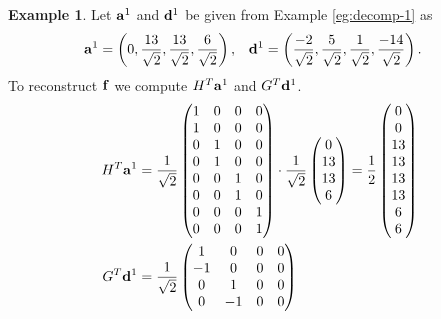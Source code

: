 \documentclass[12pt]{article}
\theoremstyle{definition}
\newtheorem{example}[definition]{Example}
\begin{document}
  \begin{example}
    Let \(\vb{a}^1\) and \(\vb{d}^1\) be given from Example \ref{eg:decomp-1} as
    \begin{align*}
      \vb{a}^1 &= \left(
        0,
        \frac{13}{\sqrt{2}},
        \frac{13}{\sqrt{2}},
        \frac{6}{\sqrt{2}}
      \right), &
      \vb{d}^1 &= \left(
        \frac{-2}{\sqrt{2}},
        \frac{5}{\sqrt{2}},
        \frac{1}{\sqrt{2}},
        \frac{-14}{\sqrt{2}}
      \right).
    \end{align*}
    To reconstruct \(\vb{f}\) we compute \(H^T\vb{a}^1\) and \(G^T\vb{d}^1\).
    \begin{align*}
      H^T\vb{a}^1 &= \frac{1}{\sqrt{2}}
      \begin{pmatrix}
        1 & 0 & 0 & 0\\
        1 & 0 & 0 & 0\\
        0 & 1 & 0 & 0\\
        0 & 1 & 0 & 0\\
        0 & 0 & 1 & 0\\
        0 & 0 & 1 & 0\\
        0 & 0 & 0 & 1\\
        0 & 0 & 0 & 1
      \end{pmatrix} \cdot \frac{1}{\sqrt{2}}
      \begin{pmatrix}
        0 \\
        13 \\
        13 \\
        6
      \end{pmatrix} = \frac{1}{2}
      \begin{pmatrix}
        0 \\
        0 \\
        13 \\
        13 \\
        13 \\
        13 \\
        6 \\
        6 \\
      \end{pmatrix}\\
      G^T\vb{d}^1 &= \frac{1}{\sqrt{2}}
      \begin{pmatrix}
        1 & 0 & 0 & 0\\
        -1 & 0 & 0 & 0\\
        0 & 1 & 0 & 0\\
        0 & -1 & 0 & 0\\

\end{pmatrix}
\end{align*}
\end{example}
\end{document}
